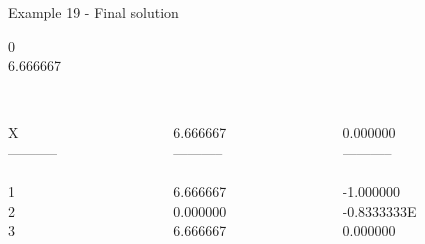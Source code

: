 \begin{frame}{Example 19 - Final solution}

  0\\
  6.666667\\

\begin{columns}[t]
\begin{column}{0.3\textwidth}
\\
X\\
-----------\\
\\
1\\
2\\
3\\

\end{column}
\begin{column}{0.3\textwidth}
\\
6.666667\\

-----------\\
\\
6.666667\\
0.000000\\
6.666667\\

\end{column}

\begin{column}{0.3\textwidth}
\\
0.000000\\

-----------\\
\\
-1.000000\\
-0.8333333E\\
0.000000\\
\end{column}
\end{columns}
\end{frame}
